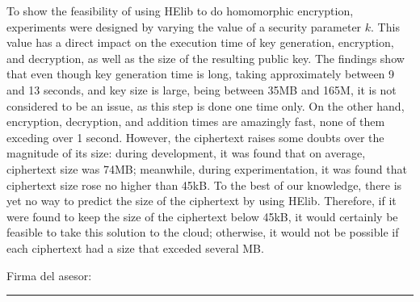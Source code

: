 To show the feasibility of using HElib to do homomorphic encryption, experiments were designed by varying the value of a security parameter $k$. This value has a direct impact on the execution time of key generation, encryption, and decryption, as well as the size of the resulting public key. The findings show that even though key generation time is long, taking approximately between 9 and 13 seconds, and key size is large, being between 35MB and 165M, it is not considered to be an issue, as this step is done one time only. On the other hand, encryption, decryption, and addition times are amazingly fast, none of them exceding over 1 second. However, the ciphertext raises some doubts over the magnitude of its size: during development, it was found that on average, ciphertext size was 74MB; meanwhile, during experimentation, it was found that ciphertext size rose no higher than 45kB. To the best of our knowledge, there is yet no way to predict the size of the ciphertext by using HElib. Therefore, if it were found to keep the size of the ciphertext below 45kB, it would certainly be feasible to take this solution to the cloud; otherwise, it would not be possible if each ciphertext had a size that exceded several MB.

\noindent Firma del asesor: \rule{72mm}{0.3pt}

\vspace*{-4mm}

\noindent \phantom{Firma del asesor: m} \asesor

